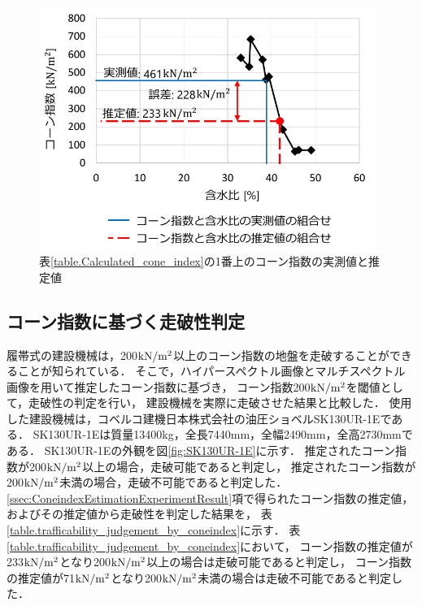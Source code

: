 \begin{figure}[p]
      \begin{center}
            \includegraphics[width=11cm]{./ch5_ConeIndexEstimation/Fig/validationsoil_coneindex_and_watercontent_relationship_compressed.pdf}
            \caption{表\ref{table.Calculated_cone_index}の1番上のコーン指数の実測値と推定値}
            \label{fig:validationsoil_coneindex_and_watercontent_relationship}
      \end{center}
\end{figure}

\clearpage

\subsection{コーン指数に基づく走破性判定}
\label{ssec:TrafficabilityJudgementByConeindex}

履帯式の建設機械は，200${\rm kN/m^2}$以上のコーン指数の地盤を走破することができることが知られている\cite{古谷2016}．
そこで，ハイパースペクトル画像とマルチスペクトル画像を用いて推定したコーン指数に基づき，
コーン指数200${\rm kN/m^2}$を閾値として，走破性の判定を行い，
建設機械を実際に走破させた結果と比較した．
使用した建設機械は，コベルコ建機日本株式会社の油圧ショベルSK130UR-1Eである．
SK130UR-1Eは質量13400kg，全長7440mm，全幅2490mm，全高2730mmである．
SK130UR-1Eの外観を図\ref{fig:SK130UR-1E}に示す．
推定されたコーン指数が200${\rm kN/m^2}$以上の場合，走破可能であると判定し，
推定されたコーン指数が200${\rm kN/m^2}$未満の場合，走破不可能であると判定した．
\ref{ssec:ConeindexEstimationExperimentResult}項で得られたコーン指数の推定値，およびその推定値から走破性を判定した結果を，
表\ref{table.trafficability_judgement_by_coneindex}に示す．
表\ref{table.trafficability_judgement_by_coneindex}において，
コーン指数の推定値が233${\rm kN/m^2}$となり200${\rm kN/m^2}$以上の場合は走破可能であると判定し，
コーン指数の推定値が71${\rm kN/m^2}$となり200${\rm kN/m^2}$未満の場合は走破不可能であると判定した．

